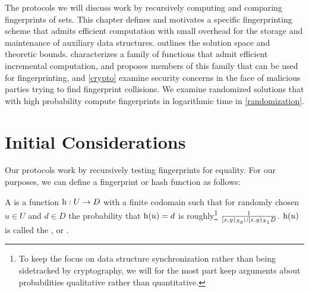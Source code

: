 
The protocols we will discuss work by recursively computing and comparing fingerprints of sets.
This chapter defines and motivates a specific fingerprinting scheme that admits efficient computation with small overhead for the storage and maintenance of auxiliary data structures.  outlines the solution space and theoretic bounds.  characterizes a family of functions that admit efficient incremental computation, and  proposes members of this family that can be used for fingerprinting, and \cref{crypto} examine security concerns in the face of malicious parties trying to find fingerprint collisions. We examine randomized solutions that with high probability compute fingerprints in logarithmic time in \cref{randomization}.



\section{Initial Considerations}
\label{initial-considerations}

Our protocols work by recursively testing fingerprints for equality. For our purposes, we can define a fingerprint or hash function as follows:

\begin{definition}
A  is a function ${\operatorname{h}}: {U} \rightarrow {D}$ with a finite codomain such that for randomly chosen $u \in U$ and $d \in D$ the probability that $\operatorname{h}(u) = d$ is roughly\footnote{To keep the focus on data structure synchronization rather than being sidetracked by cryptography, we will for the most part keep arguments about probabilities qualitative rather than quantitative.} $\frac{1}{[{x},{y})_{X_0} \cup [{x},{y})_{X_1}{D}}$. $\operatorname{h}(u)$ is called the ,  or .
\end{definition}

